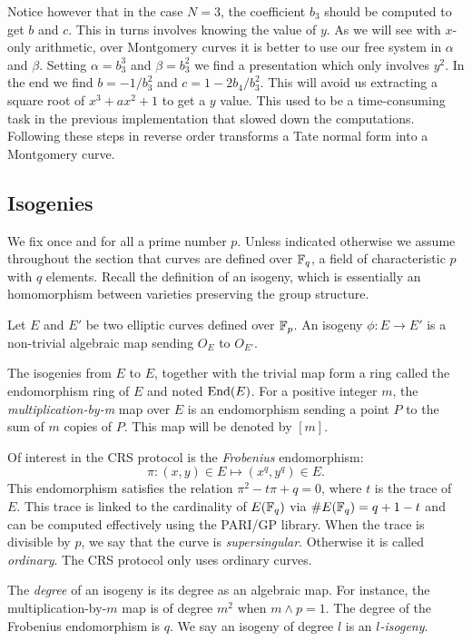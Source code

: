 \documentclass[../main/main.tex]{subfiles}
\begin{document}
Notice however that in the case $N=3$, the coefficient $b_3$ should be computed to get $b$ and $c$.
This in turns involves knowing the value of $y$.
As we will see with $x$-only arithmetic, over Montgomery curves it is better to use our free system in $\alpha$ and $\beta$.
Setting $\alpha = b_3^3$ and $\beta = b_3^2$ we find a presentation which only involves $y^2$.
In the end we find $b = -1/b_3^2$ and $c = 1 - 2b_4 / b_3^2$.
This will avoid us extracting a square root of $x^3 + ax^2 + 1$ to get a $y$ value.
This used to be a time-consuming task in the previous implementation that slowed down the computations.
Following these steps in reverse order transforms a Tate normal form into a Montgomery curve.

\subsection{Isogenies}
We fix once and for all a prime number $p$.
Unless indicated otherwise we assume throughout the section that curves are defined over $\mathbb{F}_q$, a field of characteristic $p$ with $q$ elements.
Recall the definition of an isogeny, which is essentially an homomorphism between varieties preserving the group structure.
\begin{definition}
	Let $E$ and $E'$ be two elliptic curves defined over $\mathbb{F}_p$.
	An isogeny $\phi:E\rightarrow E'$ is a non-trivial algebraic map sending $O_E$ to $O_{E'}$.
\end{definition}
The isogenies from $E$ to $E$, together with the trivial map form a ring called the endomorphism ring of $E$ and noted $\text{End} (E)$.
For a positive integer $m$, the \textit{multiplication-by-m} map over $E$ is an endomorphism sending a point $P$ to the sum of $m$ copies of $P$.
This map will be denoted by $[m]$.
\begin{example}
Of interest in the CRS protocol is the \textit{Frobenius} endomorphism:
	\[
		\pi: (x, y)\in E\mapsto (x^q, y^q)\in E.
	\]
This endomorphism satisfies the relation $\pi ^2 -t\pi + q = 0$, where $t$ is the trace of $E$.
This trace is linked to the cardinality of $E(\mathbb{F}_q)$ via $\# E(\mathbb{F}_q) = q+1 -t$ and can be computed effectively using the PARI/GP library.
When the trace is divisible by $p$, we say that the curve is \textit{supersingular}.
Otherwise it is called \textit{ordinary}.
The CRS protocol only uses ordinary curves.
\end{example}
The \textit{degree} of an isogeny is its degree as an algebraic map.
For instance, the multiplication-by-$m$ map is of degree $m^2$ when $m\wedge p = 1$.
The degree of the Frobenius endomorphism is $q$.
We say an isogeny of degree $l$ is an $l$\textit{-isogeny}.
\end{document}
